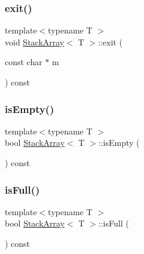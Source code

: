 \mbox{\label{class_stack_array_a0253a4feadf1236bcdde253196878b23}} 
\subsubsection{\texorpdfstring{exit()}{exit()}}
{\footnotesize\ttfamily template$<$typename T $>$ \\
void \mbox{\hyperlink{class_stack_array}{Stack\+Array}}$<$ T $>$\+::exit (\begin{DoxyParamCaption}\item[{const char $\ast$}]{m }\end{DoxyParamCaption}) const\hspace{0.3cm}{\ttfamily [private]}}

\mbox{\label{class_stack_array_a2121b2faf37e6c109557e78dfb90f875}} 
\subsubsection{\texorpdfstring{is\+Empty()}{isEmpty()}}
{\footnotesize\ttfamily template$<$typename T $>$ \\
bool \mbox{\hyperlink{class_stack_array}{Stack\+Array}}$<$ T $>$\+::is\+Empty (\begin{DoxyParamCaption}{ }\end{DoxyParamCaption}) const}

\mbox{\label{class_stack_array_a155f697a9ab24f060f18866a67425c52}} 
\subsubsection{\texorpdfstring{is\+Full()}{isFull()}}
{\footnotesize\ttfamily template$<$typename T $>$ \\
bool \mbox{\hyperlink{class_stack_array}{Stack\+Array}}$<$ T $>$\+::is\+Full (\begin{DoxyParamCaption}{ }\end{DoxyParamCaption}) const}

\mbox{\label{class_stack_array_af044917811a2072e0182aa3062d5f95a}} 
